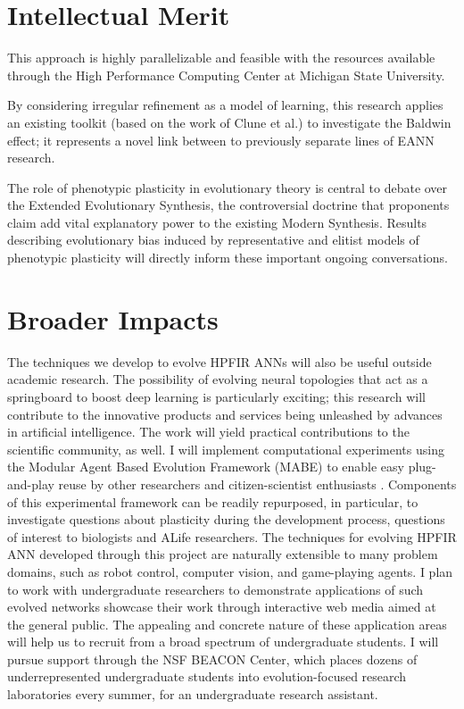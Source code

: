 \section{Intellectual Merit}

This approach is highly parallelizable\autocite{Mengistu2016EvolvabilityIt} and feasible with the resources available through the High Performance Computing Center at Michigan State University.

By considering irregular refinement as a model of learning, this research applies an existing toolkit (based on the work of Clune et al.) to investigate the Baldwin effect;
it represents a novel link between to previously separate lines of EANN research.\autocite{Clune2011OnRegularity,Downing2010TheNetworks}

The role of phenotypic plasticity in evolutionary theory is central to debate over the Extended Evolutionary Synthesis, the controversial doctrine that proponents claim add vital explanatory power to the existing Modern Synthesis.\autocite{Laland2014DoesRethink}
Results describing evolutionary bias induced by representative and elitist models of phenotypic plasticity will directly inform these important ongoing conversations.

\section{Broader Impacts}

The techniques we develop to evolve HPFIR ANNs will also be useful outside academic research.
The possibility of evolving neural topologies that act as a springboard to boost deep learning is particularly exciting; this research will contribute to the innovative products and services being unleashed by advances in artificial intelligence.
The work will yield practical contributions to the scientific community, as well.
I will implement computational experiments using the Modular Agent Based Evolution Framework (MABE) to enable easy plug-and-play reuse by other researchers and citizen-scientist enthusiasts \autocite{Hintze2017Mabe}.
Components of this experimental framework can be readily repurposed, in particular, to investigate questions about plasticity during the development process, questions of interest to biologists and ALife researchers.
The techniques for evolving HPFIR ANN developed through this project are naturally extensible to many problem domains, such as robot control, computer vision, and game-playing agents.
I plan to work with undergraduate researchers to demonstrate applications of such evolved networks showcase their work through interactive web media aimed at the general public.
The appealing and concrete nature of these application areas will help us to recruit from a broad spectrum of undergraduate students.
I will pursue support through the NSF BEACON Center, which places dozens of underrepresented undergraduate students into evolution-focused research laboratories every summer, for an undergraduate research assistant.
